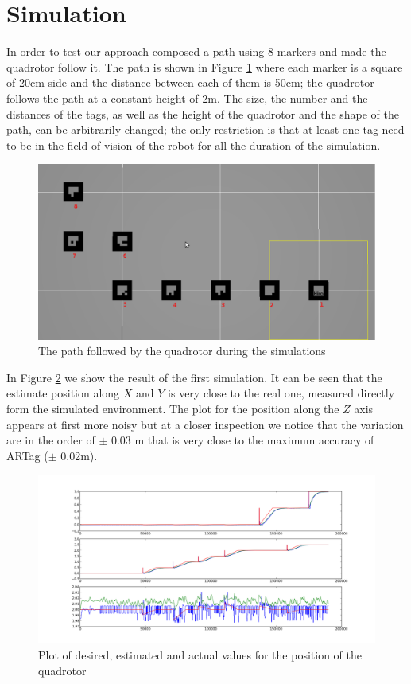 \section{Simulation}

In order to test our approach composed a path using 8 markers and made the quadrotor follow it. The path is shown in Figure \ref{fig:path} where each marker is a square of 20cm side and the distance between each of them is 50cm; the quadrotor follows the path at a constant height of 2m. The size, the number and the distances of the tags, as well as the height of the quadrotor and the shape of the path, can be arbitrarily changed; the only restriction is that at least one tag need to be in the field of vision of the robot for all the duration of the simulation.

\begin{figure}[h!]
  \centering
    \includegraphics[scale=0.35]{figs/path.png}
  \caption{The path followed by the quadrotor during the simulations}
  \label{fig:path}
\end{figure}


In Figure \ref{fig:plot} we show the result of the first simulation. It can be seen that the estimate position along $X$ and $Y$ is very close to the real one, measured directly form the simulated environment. The plot for the position along the $Z$ axis appears at first more noisy but at a closer inspection we notice that the variation are in the order of $\pm$ 0.03 m that is very close to the maximum accuracy of ARTag ($\pm$ 0.02m).

\begin{figure}[h!]
  \centering
    \includegraphics[scale=0.35]{figs/plot.png}
  \caption{Plot of desired, estimated and actual values for the position of the quadrotor}
  \label{fig:plot}
\end{figure}


